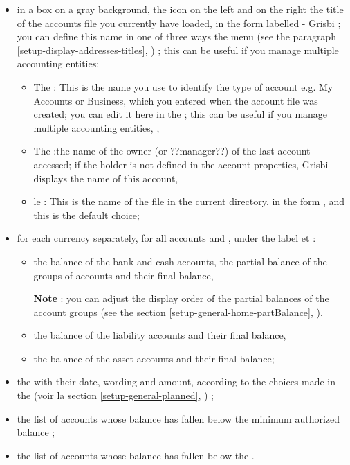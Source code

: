 \begin{itemize}
	 \item in a box on a gray background, the  icon on the left and on the right  the title of the accounts file you currently have loaded, in the form  \og labelled - Grisbi\fg{} ; you can define this name in one of three ways the  menu (see the paragraph \vref{setup-display-addresses-titles}, ) ; this can be useful if you manage multiple accounting entities:
		\begin{itemize}
			 \item The  : This is the name you use to identify the type of account e.g. \og My Accounts \fg{} or \og Business\fg{}, which you entered when the account file was created; you can edit it here in the    ; this can be useful if you manage multiple accounting entities, , 
			 \item The  :the name of the owner (or ??manager??) of the last account accessed; if the holder is not defined in the account properties, Grisbi displays the name of this account,
			 \item le  :  This is the name of the file in the current directory, in the form  , and this is the default choice;
		\end{itemize}
		
	 \item for each currency separately, for all accounts and ,  under the label  et  :
		\begin{itemize}
			 \item the balance of the bank and cash accounts, the partial balance of the groups of accounts and their final balance,

			 \textbf{Note} : you can adjust the display order of the partial balances of the account groups (see the section \vref{setup-general-home-partBalance}, ).			 
			 \item the balance of the liability accounts and their final balance,
			 \item the balance of the asset accounts and their final balance;
		\end{itemize}
	\item the  with their date, wording and amount, according to the choices made in the  (voir la section \vref{setup-general-planned}, ) ;
	\item the list of accounts whose balance has fallen below the minimum authorized balance  ;
	\item the list of accounts whose balance has fallen below the  .
\end{itemize}

